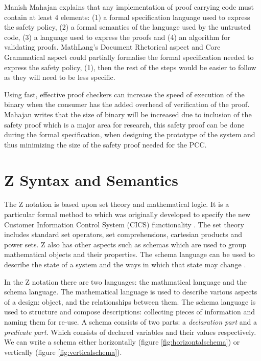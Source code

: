 Manish Mahajan \cite{pccman} explains that any implementation of proof carrying code must contain at least 4 elements: (1) a formal specification language used to express the safety policy, (2) a formal semantics of the language used by the untrusted code, (3) a language used to express the proofs and (4) an algorithm for validating proofs. MathLang's Document Rhetorical aspect and Core Grammatical aspect could partially formalise the formal specification needed to express the safety policy, (1), then the rest of the steps would be easier to follow as they will need to be less specific.

Using fast, effective proof checkers can increase the speed of execution of the binary when the consumer has the added overhead of verification of the proof. Mahajan writes that the size of binary will be increased due to inclusion of the safety proof which is a major area for research, this safety proof can be done during the formal specification, when designing the prototype of the system and thus minimizing the size of the safety proof needed for the PCC.

\section{Z Syntax and Semantics}

The Z notation is based upon set theory and mathematical logic. It is a particular formal method to which was originally developed to specify the new Customer Information Control System (CICS) functionality \cite{cics}. The set theory includes standard set operators, set comprehensions, cartesian products and power sets. Z also has other aspects such as schemas which are used to group mathematical objects and their properties. The schema language can be used to describe the state of a system and the ways in which that state may change \cite{Woodcock:1996:UZS:235337}.

In the Z notation there are two languages: the mathmatical language and the schema language. The mathematical language is used to describe various aspects of a design: object, and the relationships between them. The schema language is used to structure and compose descriptions: collecting pieces of information and naming them for re-use. A schema consists of two parts: a \emph{declaration part} and a \emph{predicate part}. Which consists of declared variables and their values respectively. We can write a schema either horizontally (figure \ref{fig:horizontalschema}) or vertically (figure \ref{fig:verticalschema}).


